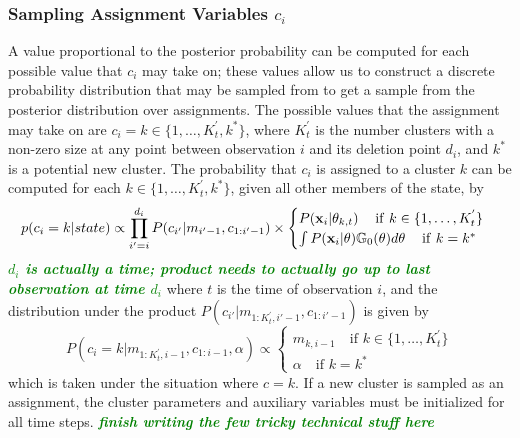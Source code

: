 \documentclass[smallcondensed, final]{svjour3}
\newcommand{\willie}[1]{\textcolor{green}{\textsf{\emph{\textbf{\textcolor{green}{#1}}}}}}
\begin{document}
\subsubsection{Sampling Assignment Variables $c_{i}$}
\label{sec:sample_assignments}

A value proportional to the posterior probability can be computed for each possible value that $c_{i}$ may take on; these values allow us to construct a discrete probability distribution that may be sampled from to get a sample from the posterior distribution over assignments. The possible values that the assignment may take on are $c_{i} = k \in \{ 1 , \ldots ,  K_{t}^{'}, k^{*}\}$, where $K_{t}^{'}$ is the number clusters with a non-zero size at any point between observation $i$ and its deletion point $d_{i}$, and $k^{*}$ is a potential new cluster. The probability that $c_{i}$ is assigned to a cluster $k$ can be computed for each $k \in \{ 1 , \ldots ,  K_{t}^{'}, k^{*} \}$, given all other members of the state, by
\begin{equation}
p(c_{i} = k | state) \propto \prod_{i' = i}^{d_{i}} P(c_{i'} | m_{i'-1}, c_{1:i'-1}) \newline \times
\begin{cases}
	P(\bold{x}_{i} | \theta_{k,t})                                        \hspace{12pt} \text{if} \hspace{4pt} k \in \{ 1, \ldots, K_{t}^{'} \} \\
	\int P(\bold{x}_{i} | \theta) \mathbb{G}_{0}(\theta) d\theta    \hspace{12pt} \text{if}  \hspace{4pt}  k = k^{*}
\end{cases}
\end{equation}
\willie{$d_{i}$ is actually a time; product needs to actually go up to last observation at time $d_{i}$} where $t$ is the time of observation $i$, and the distribution under the product $P(c_{i'} | m_{1:K_{t}^{'}, i'-1}, c_{1:i'-1})$ is given by 
\begin{equation}
P(c_{i} = k | m_{1:K_{t}^{'}, i-1}, c_{1:i-1}, \alpha) \propto 
\begin{cases}
m_{k, i-1} \hspace{12pt} \text{if} \hspace{4pt} k \in \{ 1, \ldots, K_{t}^{'} \} \\
\alpha \hspace{12pt} \text{if}  \hspace{4pt}  k = k^{*}
\end{cases}
\end{equation}
which is taken under the situation where $c = k$. If a new cluster is sampled as an assignment, the cluster parameters and auxiliary variables must be initialized for all time steps. \willie{finish writing the few tricky technical stuff here}
\end{document}
